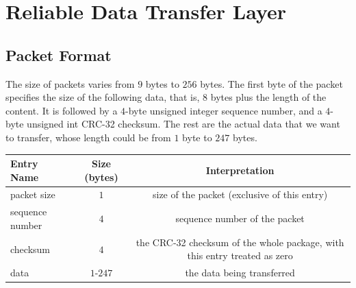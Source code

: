 \documentclass[10pt,a4paper]{article}
\begin{document}
\section{Reliable Data Transfer Layer}
\subsection{Packet Format}
    The size of packets varies from $9$ bytes to $256$ bytes. The first byte of the packet specifies the size of the following data, that is, $8$ bytes plus the length of the content. It is followed by a $4$-byte unsigned integer sequence number, and a $4$-byte unsigned int CRC-32 checksum. The rest are the actual data that we want to transfer, whose length could be from $1$ byte to $247$ bytes.

\begin{center}
    \begin{tabular}{lcc}
        Entry Name & Size (bytes) & Interpretation \\%
            \hline
        packet size & $1$ &  size of the packet (exclusive of this entry)\\ 
        sequence number & $4$ & sequence number of the packet\\
        checksum & $4$ & the CRC-32 checksum of the whole package, with this entry treated as zero\\
        data & $1$-$247$ & the data being transferred\\
    \end{tabular}
\end{center}

    
\end{document}
